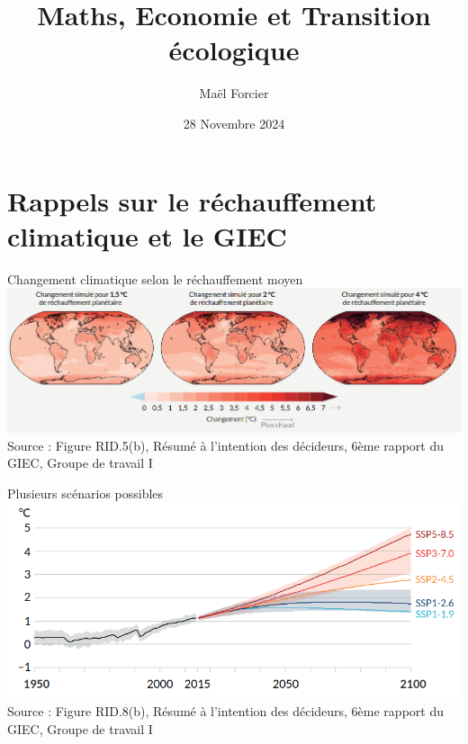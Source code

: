 \documentclass{beamer}
\begin{document}
\title{Maths, Economie et Transition écologique}
\author[Maël Forcier]{Maël Forcier}
\date[28/11/2024]{
\small{
28 Novembre 2024} }

\maketitle


\newtheorem{prop}{Proposition}
\newtheorem{hypo}{Hypothesis}
\newtheorem{defi}{Definition}
\newtheorem{nota}{Notation}
\newtheorem{genform}{General Form}


\section{Rappels sur le réchauffement climatique et le GIEC}

  

\begin{frame}{Changement climatique selon le réchauffement moyen}
\centering
\includegraphics[scale=0.34]{images/Temperature.png}
\\
\tiny{Source : Figure RID.5(b), Résumé à l'intention des décideurs,
 6ème rapport du GIEC, Groupe de travail I}
\end{frame}

\begin{frame}{Plusieurs scénarios possibles}
\centering
\includegraphics[scale=0.41]{images/IPCC_scenarios.png}
\\
\tiny{Source : Figure RID.8(b), Résumé à l'intention des décideurs,
 6ème rapport du GIEC, Groupe de travail I}
\end{frame}
\end{document}
